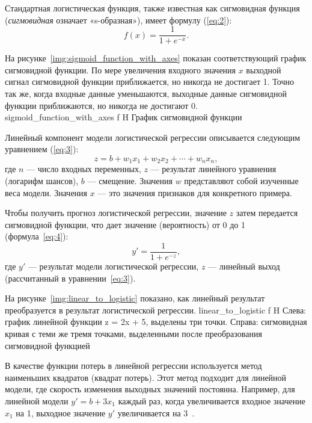 Стандартная логистическая функция, также известная как сигмовидная функция (\textit{сигмовидная} означает «s-образная»), имеет формулу (\ref{eq:2}):
\begin{equation}
    f(x) = \frac{1}{1 + e^{-x}}.
    \label{eq:2}
\end{equation}

На рисунке~\ref{img:sigmoid_function_with_axes} показан соответствующий график сигмовидной функции.
По мере увеличения входного значения $x$ выходной сигнал сигмовидной функции приближается, но никогда не достигает 1.
Точно так же, когда входные данные уменьшаются, выходные данные сигмовидной функции приближаются, но никогда не достигают 0.
{sigmoid_function_with_axes}
{f}
{H}
{\textwidth}
{График сигмовидной функции}

Линейный компонент модели логистической регрессии описывается следующим уравнением (\ref{eq:3}):
\begin{equation}
    z = b + w_1 x_1 + w_2 x_2 +\cdots + w_n x_n,
    \label{eq:3}
\end{equation}
где $n$ --- число входных переменных, $z$ --- результат линейного уравнения (логарифм шансов), $b$ --- смещение.
Значения $w$ представляют собой изученные веса модели.
Значения $x$ --- это значения признаков для конкретного примера.

Чтобы получить прогноз логистической регрессии, значение $z$ затем передается сигмовидной функции, что дает значение (вероятность) от 0 до 1 (формула~\ref{eq:4}):
\begin{equation}
    y' = \frac{1}{1 + e^{-z}},
    \label{eq:4}
\end{equation}
где $y'$ --- результат модели логистической регрессии, $z$ --- линейный выход (рассчитанный в уравнении~\ref{eq:3}).

На рисунке~\ref{img:linear_to_logistic} показано, как линейный результат преобразуется в результат логистической регрессии.
{linear_to_logistic}
{f}
{H}
{\textwidth}
{Слева: график линейной функции z = 2x + 5, выделены три точки. Справа: сигмовидная кривая с теми же тремя точками, выделенными после преобразования сигмовидной функцией}

В качестве функции потерь в линейной регрессии используется метод наименьших квадратов (квадрат потерь).
Этот метод подходит для линейной модели, где скорость изменения выходных значений постоянна.
Например, для линейной модели $y' = b + 3 x_1$ каждый раз, когда увеличивается входное значение $x_1$ на 1, выходное значение $y'$ увеличивается на 3~\cite{google2}.

